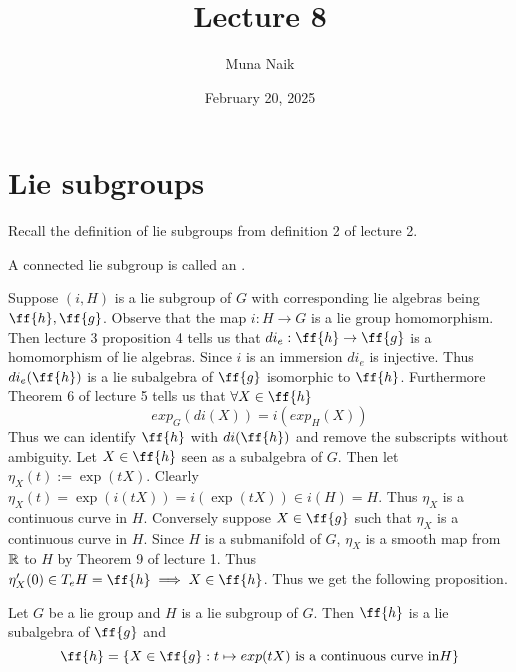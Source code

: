 \documentclass{article}
\title{Lecture 8}
\date{February 20, 2025}
\author{Muna Naik}
\begin{document}
\maketitle

\section{Lie subgroups}

Recall the definition of lie subgroups from definition 2 of lecture 2. 

\begin{definition}
    A connected lie subgroup is called an .
\end{definition}

Suppose $(i,H)$ is a lie subgroup of $G$ with corresponding lie algebras being $\ff{h},\ff{g}$. Observe that the map $i:H\to G$ is a lie group homomorphism. Then lecture 3 proposition 4 
tells us that $di_e:\ff{h}\to\ff{g}$ is a homomorphism of lie algebras. Since $i$ is an immersion $di_e$
is injective. Thus $di_e(\ff{h})$ is a lie subalgebra of $\ff{g}$ isomorphic to $\ff{h}$. Furthermore 
Theorem 6 of lecture 5 tells us that $\forall X\in \ff{h}$ $$exp_G(di(X)) = i(exp_H(X))$$
Thus we can identify $\ff{h}$ with $di(\ff{h})$ and remove the subscripts without ambiguity.
Let $X\in \ff{h}$ seen as a subalgebra of $G$. Then let $\eta_X(t):=\exp(tX)$. Clearly $\eta_X(t) = \exp(i(tX)) = i(\exp(tX))\in i(H) = H$.
Thus $\eta_X$ is a continuous curve in $H$. Conversely suppose $X\in \ff{g}$ such that $\eta_X$ is a continuous curve in $H$. Since $H$ is a submanifold of $G$,
$\eta_X$ is a smooth map from $\mathbb R$ to $H$ by Theorem 9 of lecture 1. Thus $\eta_X'(0)\in T_eH = \ff{h}\implies X\in \ff{h}$.
Thus we get the following proposition.

\begin{proposition}
    Let $G$ be a lie group and $H$ is a lie subgroup of $G$. Then $\ff{h}$ is a lie subalgebra of $\ff{g}$ and 
    $$\ff{h} = \{X\in \ff{g}:t\mapsto exp(tX)\text{ is a continuous curve in}H\}$$
\end{proposition}
\end{document}
